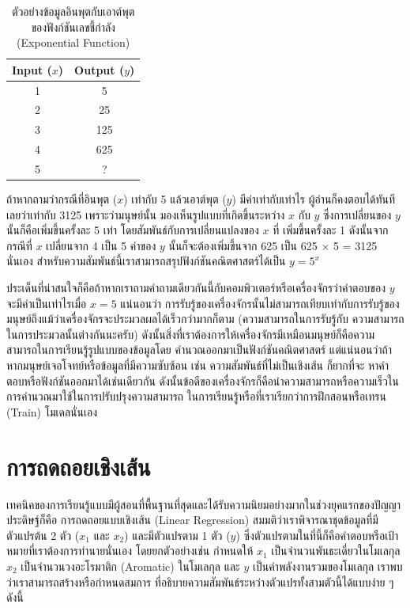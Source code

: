 \begin{table}[htbp]
    \centering
    \caption{ตัวอย่างข้อมูลอินพุตกับเอาต์พุตของฟังก์ชันเลขชี้กำลัง (Exponential Function)}
    \label{tab:simple_x_y}
    \begin{tabular}{cc}
    \toprule
    \textbf{Input ($x$)} &\textbf{Output ($y$)} \\
    \midrule
    1 &5 \\
    2 &25 \\
    3 &125 \\
    4 &625 \\
    5 &? \\
    \bottomrule
    \end{tabular}
\end{table}

ถ้าหากถามว่ากรณีที่อินพุต ($x$) เท่ากับ 5 แล้วเอาต์พุต ($y$) มีค่าเท่ากับเท่าไร ผู้อ่านก็คงตอบได้ทันทีเลยว่าเท่ากับ 3125 เพราะว่ามนุษย์นั้น%
มองเห็นรูปแบบที่เกิดขึ้นระหว่าง $x$ กับ $y$ ซึ่งการเปลี่ยนของ $y$ นั้นก็คือเพิ่มขึ้นครั้งละ 5 เท่า โดยสัมพันธ์กับการเปลี่ยนแปลงของ $x$ ที่%
เพิ่มขึ้นครั้งละ 1 ดังนั้นจากกรณีที่ $x$ เปลี่ยนจาก 4 เป็น 5 ค่าของ $y$ นั้นก็จะต้องเพิ่มขึ้นจาก 625 เป็น 625 $\times$ 5 = 3125 นั่นเอง
สำหรับความสัมพันธ์นี้เราสามารถสรุปฟังก์ชันคณิตศาสตร์ได้เป็น $y = 5^{x}$

ประเด็นที่น่าสนใจก็คือถ้าหากเราถามคำถามเดียวกันนี้กับคอมพิวเตอร์หรือเครื่องจักรว่าคำตอบของ $y$ จะมีค่าเป็นเท่าไรเมื่อ $x = 5$ แน่นอนว่า%
การรับรู้ของเครื่องจักรนั้นไม่สามารถเทียบเท่ากับการรับรู้ของมนุษย์ถึงแม้ว่าเครื่องจักรจะประมวลผลได้เร็วกว่ามากก็ตาม (ความสามารถในการรับรู้กับ%
ความสามารถในการประมวลนั้นต่างกันนะครับ) ดังนั้นสิ่งที่เราต้องการให้เครื่องจักรมีเหมือนมนุษย์ก็คือความสามารถในการเรียนรู้รูปแบบของข้อมูลโดย%
คำนวณออกมาเป็นฟังก์ชันคณิตศาสตร์ แต่แน่นอนว่าถ้าหากมนุษย์เจอโจทย์หรือข้อมูลที่มีความซับซ้อน เช่น ความสัมพันธ์ที่ไม่เป็นเชิงเส้น ก็ยากที่จะ%
หาคำตอบหรือฟังก์ชันออกมาได้เช่นเดียวกัน ดังนั้นข้อดีของเครื่องจักรก็คือนำความสามารถหรือความเร็วในการคำนวณมาใช้ในการปรับปรุงความสามารถ%
ในการเรียนรู้หรือที่เราเรียกว่าการฝึกสอนหรือเทรน (Train) โมเดลนั่นเอง

\section{การถดถอยเชิงเส้น}
\label{sec:lin_res}

เทคนิคของการเรียนรู้แบบมีผู้สอนที่พื้นฐานที่สุดและได้รับความนิยมอย่างมากในช่วงยุคแรกของปัญญาประดิษฐ์ก็คือ การถดถอยแบบเชิงเส้น 
(Linear Regression) สมมติว่าเราพิจารณาชุดข้อมูลที่มีตัวแปรต้น 2 ตัว ($x_{1}$ และ $x_{2}$) และมีตัวแปรตาม 1 ตัว ($y$) 
ซึ่งตัวแปรตามในที่นี้ก็คือคำตอบหรือเป้าหมายที่เราต้องการทำนายนั่นเอง โดยยกตัวอย่างเช่น กำหนดให้ $x_{1}$ เป็นจำนวนพันธะเดี่ยวในโมเลกุล 
$x_{2}$ เป็นจำนวนวงอะโรมาติก (Aromatic) ในโมเลกุล และ $y$ เป็นค่าพลังงานรวมของโมเลกุล เราพบว่าเราสามารถสร้างหรือกำหนดสมการ%
ที่อธิบายความสัมพันธ์ระหว่างตัวแปรทั้งสามตัวนี้ได้แบบง่าย ๆ ดังนี้

